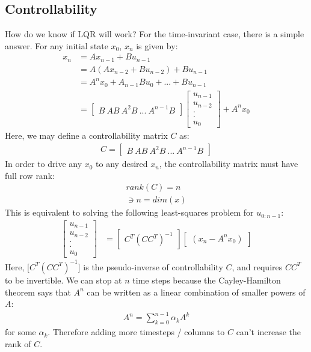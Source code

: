 \subsection{Controllability}
How do we know if LQR will work? For the time-invariant case, there is a simple answer. For any initial state $x_0$, $x_n$ is given by: 
\begin{align}
    x_n &= A x_{n-1} + B u_{n-1} \\
    &= A (Ax_{n-2} + B u_{n-2}) + B u_{n-1} \\
    &= A^n x_0 + A_{n-1} B u_0 + ... + B u_{n-1}\\
    &= \begin{bmatrix}
        B \ AB \ A^2 B \ ... \ A^{n-1} B 
    \end{bmatrix} 
    \begin{bmatrix}
        u_{n-1} \\
        u_{n-2} \\
        . \\
        . \\
        u_0
    \end{bmatrix}
    + 
    A^n x_0
\end{align}
Here, we may define a controllability matrix $C$ as: 
\begin{align}
    C = \begin{bmatrix}
        B \ AB \ A^2 B \ ... \ A^{n-1} B 
    \end{bmatrix} 
\end{align}
In order to drive any $x_0$ to any desired $x_n$, the controllability matrix must have full row rank: 
\begin{align}
    rank(C) = n \\
    \ni n = dim(x)
\end{align}
This is equivalent to solving the following least-squares problem for $u_{0:n-1}$: 
\begin{align}
    \begin{bmatrix}
        u_{n-1} \\
        u_{n-2} \\
        . \\
        . \\
        u_0
    \end{bmatrix}
    &= 
    \begin{bmatrix}
        C^T (C C^T)^{-1} 
    \end{bmatrix}
    \begin{bmatrix}
        (x_n - A^n x_0)
    \end{bmatrix}
\end{align}
Here, $\big[ C^T (C C^T)^{-1} \big]$ is the pseudo-inverse of controllability $C$, and requires $C C^T$ to be invertible. 
We can stop at $n$ time steps because the Cayley-Hamilton theorem says that $A^n$ can be written as a linear combination of smaller powers of $A$: 
\begin{align}
    A^n = \sum_{k=0}^{n-1} \alpha_k A^k 
\end{align}
for some $\alpha_k$.
Therefore adding more timesteps / columns to $C$ can't increase the rank of $C$. 